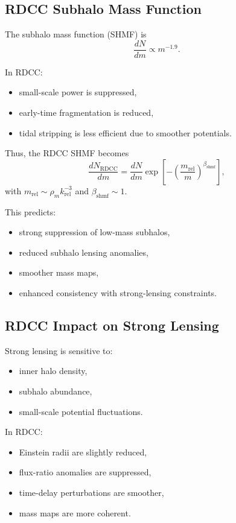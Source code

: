 \documentclass[11pt,a4paper]{article}
\begin{document}
\subsection{RDCC Subhalo Mass Function}

The subhalo mass function (SHMF) is
\begin{equation}
\frac{dN}{dm}
\propto
m^{-1.9}.
\end{equation}

In RDCC:
\begin{itemize}
\item small-scale power is suppressed,
\item early-time fragmentation is reduced,
\item tidal stripping is less efficient due to smoother potentials.
\end{itemize}

Thus, the RDCC SHMF becomes
\begin{equation}
\frac{dN_{\mathrm{RDCC}}}{dm}
=
\frac{dN}{dm}
\exp\!\left[
-
\left(
\frac{m_{\mathrm{rel}}}{m}
\right)^{\beta_{\mathrm{shmf}}}
\right],
\end{equation}
with $m_{\mathrm{rel}} \sim \rho_{m}k_{\mathrm{rel}}^{-3}$ and $\beta_{\mathrm{shmf}} \sim 1$.

This predicts:
\begin{itemize}
\item strong suppression of low-mass subhalos,
\item reduced subhalo lensing anomalies,
\item smoother mass maps,
\item enhanced consistency with strong-lensing constraints.
\end{itemize}

\subsection{RDCC Impact on Strong Lensing}

Strong lensing is sensitive to:
\begin{itemize}
\item inner halo density,
\item subhalo abundance,
\item small-scale potential fluctuations.
\end{itemize}

In RDCC:
\begin{itemize}
\item Einstein radii are slightly reduced,
\item flux-ratio anomalies are suppressed,
\item time-delay perturbations are smoother,
\item mass maps are more coherent.
\end{itemize}
\end{document}
